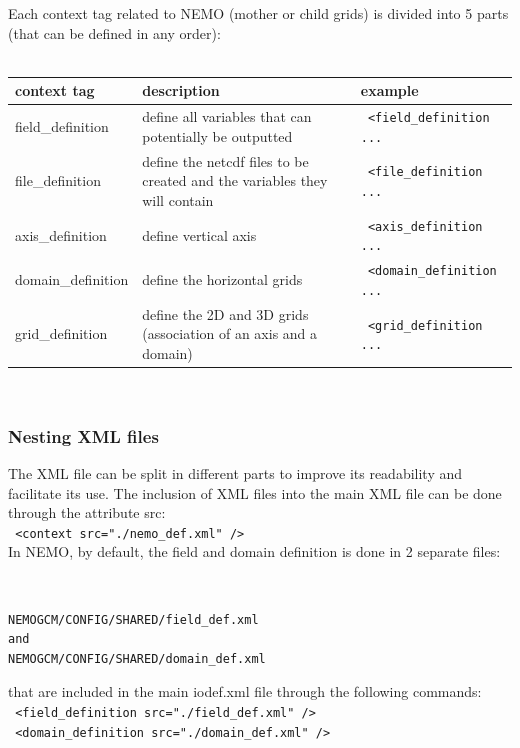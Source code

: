 \noindent Each context tag related to NEMO (mother or child grids) is divided into 5 parts (that can be defined in any order):\\
\\
\begin{tabular}{|p{3.0cm}|p{4.5cm}|p{4.5cm}|}
   \hline
   context tag &
   description &
   example \\
   \hline
   \hline
   field\_definition &
   define all variables that can potentially be outputted &
   {\scriptsize \verb? <field_definition ... ?} \\
   \hline
   file\_definition &
   define the netcdf files to be created and the variables they will contain &
   {\scriptsize \verb? <file_definition ... ?} \\
   \hline
   axis\_definition &
   define vertical axis &
   {\scriptsize \verb? <axis_definition ... ?} \\
   \hline
   domain\_definition &
   define the horizontal grids &
   {\scriptsize \verb? <domain_definition ... ?} \\
   \hline
   grid\_definition &
   define the 2D and 3D grids (association of an axis and a domain) &
   {\scriptsize \verb? <grid_definition ... ?} \\
   \hline
\end{tabular}
\\

\subsubsection{Nesting XML files}

The XML file can be split in different parts to improve its readability and facilitate its use. The inclusion of XML files into the main XML file can be done through the attribute src: \\
{\scriptsize \verb? <context src="./nemo_def.xml" /> ?}\\
 
\noindent In NEMO, by default, the field and domain definition is done in 2 separate files:
{\scriptsize \tt
\begin{verbatim}
NEMOGCM/CONFIG/SHARED/field_def.xml
and
NEMOGCM/CONFIG/SHARED/domain_def.xml 
\end{verbatim}
}
\noindent that are included in the main iodef.xml file through the following commands: \\
{\scriptsize \verb? <field_definition src="./field_def.xml" /> ? \\
\verb? <domain_definition src="./domain_def.xml" /> ? }


